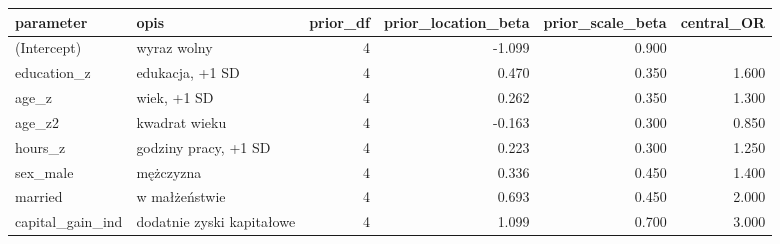 \begin{tabular}{llrrrr}
  \hline
parameter & opis & prior\_df & prior\_location\_beta & prior\_scale\_beta & central\_OR \\ 
  \hline
(Intercept) & wyraz wolny & 4 & -1.099 & 0.900 &  \\ 
  education\_z & edukacja, +1 SD & 4 & 0.470 & 0.350 & 1.600 \\ 
  age\_z & wiek, +1 SD & 4 & 0.262 & 0.350 & 1.300 \\ 
  age\_z2 & kwadrat wieku & 4 & -0.163 & 0.300 & 0.850 \\ 
  hours\_z & godziny pracy, +1 SD & 4 & 0.223 & 0.300 & 1.250 \\ 
  sex\_male & mężczyzna & 4 & 0.336 & 0.450 & 1.400 \\ 
  married & w małżeństwie & 4 & 0.693 & 0.450 & 2.000 \\ 
  capital\_gain\_ind & dodatnie zyski kapitałowe & 4 & 1.099 & 0.700 & 3.000 \\ 
   \hline
\end{tabular}
